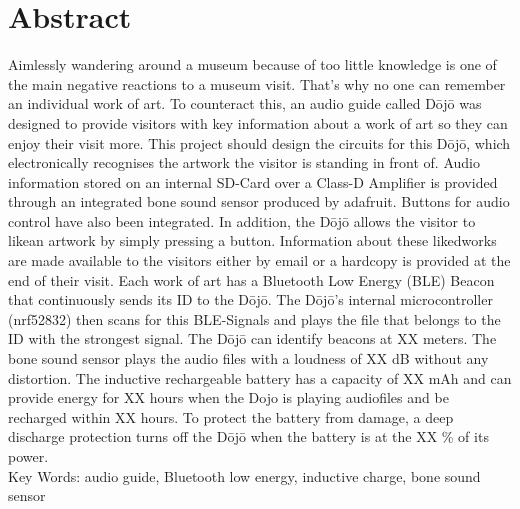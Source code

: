 \section*{Abstract}\label{sec:abstract}
Aimlessly wandering around a museum because of too little knowledge is one of the main negative reactions to a museum visit. That’s why no one can remember an individual work of art. To counteract this, an audio guide called Dōjō was designed to provide visitors with key information about a work of art so they can enjoy their visit more. This project should design the circuits for this Dōjō, which electronically recognises the artwork the visitor is standing in front of. Audio information stored on an internal SD-Card over a Class-D Amplifier is provided through an integrated bone sound sensor produced by adafruit. Buttons for audio control have also been integrated. In addition, the Dōjō allows the visitor to \glqq like\grqq an artwork by simply pressing a button. Information about these \glqq liked\grqq works are made available to the visitors either by email or a hardcopy is provided at the end of their visit. Each work of art has a Bluetooth Low Energy (BLE) Beacon that continuously sends its ID to the Dōjō. The Dōjō’s internal microcontroller (nrf52832) then scans for this BLE-Signals and plays the file that belongs to the ID with the strongest signal. The Dōjō can identify beacons at XX meters. The bone sound sensor plays the audio files with a loudness of XX dB without any distortion. The inductive rechargeable battery has a capacity of XX mAh and can provide energy for XX hours when the Dojo is playing audiofiles and be recharged within XX hours. To protect the battery from damage, a deep discharge protection turns off the Dōjō when the battery is at the XX \% of its power.\\[0.25cm]
Key Words: audio guide, Bluetooth low energy, inductive charge, bone sound sensor